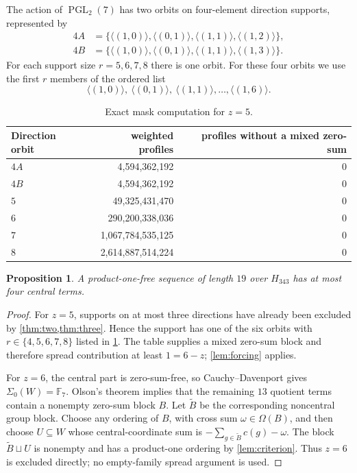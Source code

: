 \documentclass[11pt]{amsart}
\newtheorem{proposition}[theorem]{Proposition}
\theoremstyle{definition}
\newcommand{\F}{\mathbb F}
\newcommand{\HH}{H_{343}}
\newcommand{\Om}{\Omega}
\newcommand{\Sig}{\Sigma}
\begin{document}
The action of $\operatorname{PGL}_2(7)$ has two orbits on four-element
direction supports, represented by
\[
\begin{split}
4A&=\{\langle(1,0)\rangle,\langle(0,1)\rangle,
       \langle(1,1)\rangle,\langle(1,2)\rangle\},\\
4B&=\{\langle(1,0)\rangle,\langle(0,1)\rangle,
       \langle(1,1)\rangle,\langle(1,3)\rangle\}.
\end{split}
\]
For each support size $r=5,6,7,8$ there is one orbit.
For these four orbits we use the first $r$ members of the ordered list
\[
\langle(1,0)\rangle,\ \langle(0,1)\rangle,
\ \langle(1,1)\rangle,\ldots,\langle(1,6)\rangle.
\]

\begin{table}[ht]
\centering
\caption{Exact mask computation for $z=5$.}
\label{tab:z5}
\begin{tabular}{@{}lrr@{}}
\toprule
Direction orbit & weighted profiles & profiles without a mixed zero-sum\\
\midrule
$4A$ & 4,594,362,192 & 0\\
$4B$ & 4,594,362,192 & 0\\
$5$  & 49,325,431,470 & 0\\
$6$  & 290,200,338,036 & 0\\
$7$  & 1,067,784,535,125 & 0\\
$8$  & 2,614,887,514,224 & 0\\
\bottomrule
\end{tabular}
\end{table}

\begin{proposition}\label{prop:z5}
A product-one-free sequence of length $19$ over $\HH$ has at most four central terms.
\end{proposition}

\begin{proof}
For $z=5$, supports on at most three directions have already been
excluded by \cref{thm:two,thm:three}.  Hence the support has one of the
six orbits with $r\in\{4,5,6,7,8\}$ listed in \cref{tab:z5}.  The table
supplies a mixed zero-sum block and therefore
spread contribution at least $1=6-z$; \cref{lem:forcing} applies.

For $z=6$, the central part is zero-sum-free, so
Cauchy--Davenport gives $\Sig_0(W)=\F_7$.  Olson's theorem implies that
the remaining $13$ quotient terms contain a nonempty zero-sum block
$B$.  Let $\widetilde B$ be the corresponding noncentral group block.
Choose any ordering of $B$, with cross sum $\omega\in\Om(B)$, and then
choose $U\subseteq W$ whose central-coordinate sum is
$-\sum_{g\in\widetilde B}c(g)-\omega$.  The block
$\widetilde B\sqcup U$ is nonempty and has a product-one ordering by
\cref{lem:criterion}.  Thus $z=6$ is
excluded directly; no empty-family spread argument is used.
\end{proof}
\end{document}
